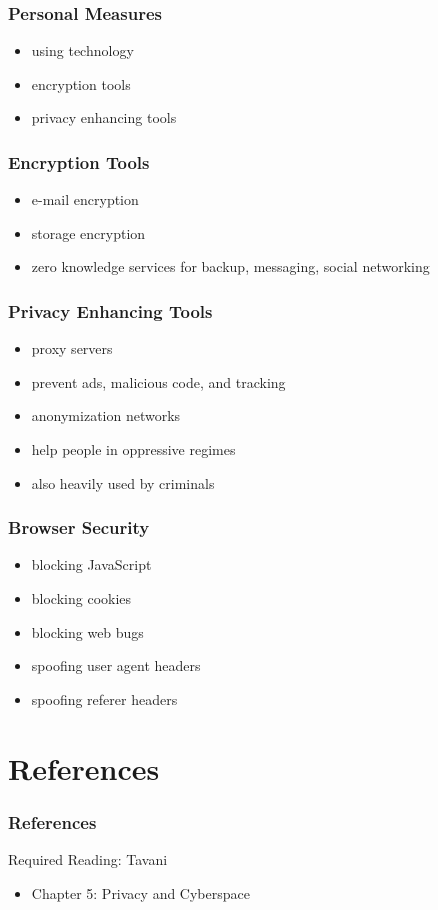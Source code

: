 \documentclass[dvipsnames]{beamer}
\theoremstyle{plain}
\begin{document}
\begin{frame}
  \frametitle{Personal Measures}

  \begin{itemize}
    \item using technology

    \medskip
    \item encryption tools
    \item privacy enhancing tools
  \end{itemize}
\end{frame}

\begin{frame}
  \frametitle{Encryption Tools}

  \begin{itemize}
    \item e-mail encryption
    \item storage encryption

    \medskip
    \item zero knowledge services for backup, messaging, social networking
  \end{itemize}
\end{frame}

\begin{frame}
  \frametitle{Privacy Enhancing Tools}

  \begin{itemize}
    \item proxy servers
    \item prevent ads, malicious code, and tracking

    \medskip
    \item anonymization networks
    \item help people in oppressive regimes
    \item also heavily used by criminals
  \end{itemize}
\end{frame}

\begin{frame}
  \frametitle{Browser Security}

  \begin{itemize}
    \item blocking JavaScript
    \item blocking cookies
    \item blocking web bugs

    \medskip
    \item spoofing user agent headers
    \item spoofing referer headers
  \end{itemize}
\end{frame}

\section*{References}

\begin{frame}
  \frametitle{References}

  \begin{block}{Required Reading: Tavani}
    \begin{itemize}
      \item Chapter 5: \alert{Privacy and Cyberspace}
    \end{itemize}
  \end{block}
\end{frame}
\end{document}
